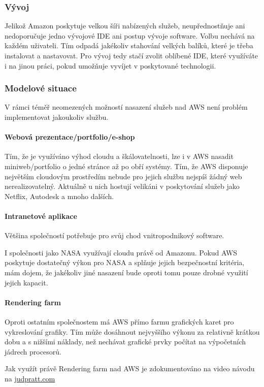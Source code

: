 \subsubsection{Vývoj}
Jelikož Amazon poskytuje velkou šíři nabízených služeb, neupřednostňuje ani nedoporučuje jedno vývojové IDE ani postup vývoje software. Volbu nechává na každém uživateli. Tím odpadá jakékoliv stahování velkých balíků, které je třeba instalovat a nastavovat. Pro vývoj tedy stačí zvolit oblíbené IDE, které využíváte i na jinou práci, pokud umožňuje vyvíjet v poskytované technologii.

\subsubsection{Modelové situace}
V rámci téměř neomezených možností nasazení služeb nad AWS není problém implementovat jakoukoliv službu.

\paragraph{Webová prezentace/portfolio/e-shop}
Tím, že je využíváno výhod cloudu a škálovatelnosti, lze i v AWS nasadit miniweb/portfolio o jedné stránce až po obří systémy. Tím, že AWS disponuje největším cloudovým prostředím nebude pro jejich službu nejspíš žádný web nerealizovatelný. Aktuálně u nich hostují velikáni v poskytování služeb jako Netflix, Autodesk a mnoho dalších.

\paragraph{Intranetové aplikace}
Většina společností potřebuje pro svůj chod vnitropodnikový software.

I společnosti jako NASA využívají cloudu právě od Amazonu. Pokud AWS poskytuje dostatečný výkon pro NASA a splňuje jejich bezpečnostní kritéria, mám dojem, že jakékoliv jiné nasazení bude oproti tomu pouze drobné využití jejich kapacit.

\paragraph{Rendering farm}
Oproti ostatním společnostem má AWS přímo farmu grafických karet pro vykreslování grafiky. Tím může dosáhnout nejvyššího výkonu za relativně krátkou dobu a s nižšími náklady, než nechávat grafické prvky počítat na výpočetních jádrech procesorů.

Jak využít právě Rendering farm nad AWS je zdokumentováno na video návodu na \href{http://www.judpratt.com/tutorials/ec2-renderfarm/}{judpratt.com\cite{judpratt:ec2renderfarm}}

